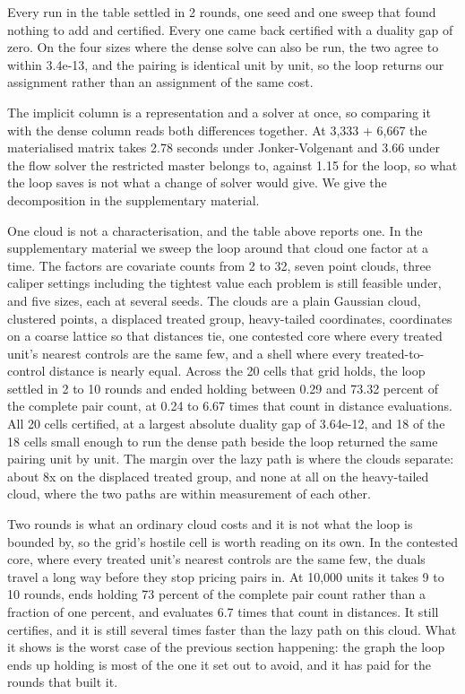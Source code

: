Every run in the table settled in 2 rounds, one seed and one sweep
that found nothing to add and certified. Every one came back certified with a
duality gap of zero. On the four sizes where the dense solve can also be run,
the two agree to within 3.4e-13, and the
pairing is identical unit by unit, so the loop returns our assignment rather
than an assignment of the same cost.

The implicit column is a representation and a solver at once, so comparing it
with the dense column reads both differences together. At 3,333 + 6,667 the
materialised matrix takes 2.78 seconds
under Jonker-Volgenant and 3.66
under the flow solver the restricted master belongs to, against 1.15 for the loop, so what the loop
saves is not what a change of solver would give. We give the decomposition in
the supplementary material.

One cloud is not a characterisation, and the table above reports one. In the
supplementary material we sweep the loop around that cloud one factor at a
time. The factors are covariate counts from 2 to
32, seven point clouds, three caliper settings including the
tightest value each problem is still feasible under, and five sizes, each at
several seeds. The clouds are a plain Gaussian cloud, clustered points, a
displaced treated group, heavy-tailed coordinates, coordinates on a coarse
lattice so that distances tie, one contested core where every treated unit's
nearest controls are the same few, and a shell where every treated-to-control
distance is nearly equal. Across the 20 cells that grid holds, the loop settled in
2 to 10 rounds and ended holding between
0.29 and 73.32 percent of
the complete pair count, at 0.24 to
6.67 times that count in distance evaluations.
All 20 cells certified, at a largest absolute duality gap of 3.64e-12, and 18 of the 18 cells small enough to run the dense
path beside the loop returned the same pairing unit by unit. The margin over the lazy path is where the clouds separate: about
8x on the displaced treated group, and none at all on
the heavy-tailed cloud, where the two paths are within measurement of each other.

Two rounds is what an ordinary cloud costs and it is not what the loop is
bounded by, so the grid's hostile cell is worth reading on its own. In the
contested core, where every treated unit's nearest controls are the same few,
the duals travel a long way before they stop pricing pairs in. At 10,000 units it takes 9
to 10 rounds, ends holding 73 percent of the complete pair count rather than a
fraction of one percent, and evaluates 6.7 times that count in distances. It still certifies,
and it is still several times faster than the
lazy path on this cloud. What it shows is the worst case of the previous
section happening: the graph the loop ends up holding is most of the one it
set out to avoid, and it has paid for the rounds that built it.

